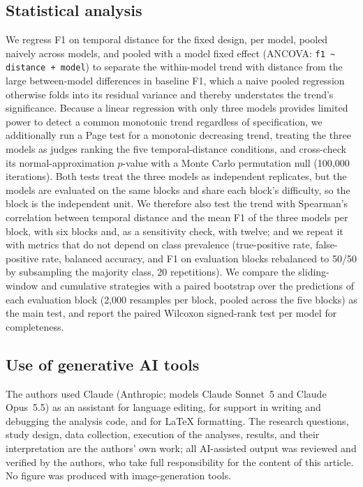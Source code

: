 \documentclass[10pt, a4paper, oneside]{article}
\begin{document}
\subsection{Statistical analysis}
We regress F1 on temporal distance for the fixed design, per model, pooled naively across models, and pooled with a model fixed effect (ANCOVA: \texttt{f1 \textasciitilde{} distance + model}) to separate the within-model trend with distance from the large between-model differences in baseline F1, which a naive pooled regression otherwise folds into its residual variance and thereby understates the trend's significance. Because a linear regression with only three models provides limited power to detect a common monotonic trend regardless of specification, we additionally run a Page test for a monotonic decreasing trend, treating the three models as judges ranking the five temporal-distance conditions, and cross-check its normal-approximation $p$-value with a Monte Carlo permutation null (100,000 iterations). Both tests treat the three models as independent replicates, but the models are evaluated on the same blocks and share each block's difficulty, so the block is the independent unit. We therefore also test the trend with Spearman's correlation between temporal distance and the mean F1 of the three models per block, with six blocks and, as a sensitivity check, with twelve; and we repeat it with metrics that do not depend on class prevalence (true-positive rate, false-positive rate, balanced accuracy, and F1 on evaluation blocks rebalanced to 50/50 by subsampling the majority class, 20 repetitions). We compare the sliding-window and cumulative strategies with a paired bootstrap over the predictions of each evaluation block (2{,}000 resamples per block, pooled across the five blocks) as the main test, and report the paired Wilcoxon signed-rank test per model for completeness.

\subsection{Use of generative AI tools}
The authors used Claude (Anthropic; models Claude Sonnet~5 and Claude Opus~5.5) as an assistant for language editing, for support in writing and debugging the analysis code, and for LaTeX formatting. The research questions, study design, data collection, execution of the analyses, results, and their interpretation are the authors' own work; all AI-assisted output was reviewed and verified by the authors, who take full responsibility for the content of this article. No figure was produced with image-generation tools.
\end{document}
